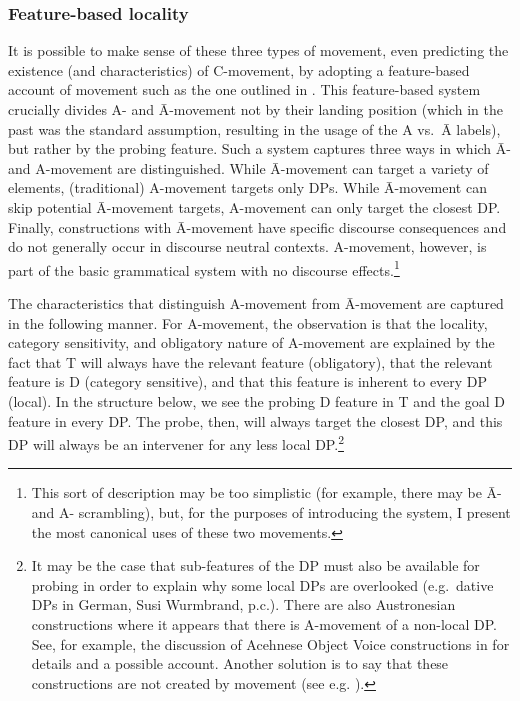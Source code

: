 \documentclass[output=paper,colorlinks,citecolor=brown,
]{langscibook}
\begin{document}
\subsubsection{Feature-based locality\label{sec:feature}}

It is possible to make sense of these three types of movement, even predicting the existence (and characteristics) of C-movement, by adopting a feature-based account of movement such as the one outlined in \citet{vanUrk:2015a}. This feature-based system crucially divides A- and \=A-movement not by their landing position (which in the past was the standard assumption, resulting in the usage of the A vs.\ \=A labels), but rather by the probing feature. Such a  system  captures three ways in which \=A- and A-movement are distinguished.  While \=A-movement can target a variety of elements, (traditional) A-movement targets only DPs.  While \=A-movement can skip potential \=A-movement targets, A-movement can only target the closest DP.  Finally, constructions with \=A-movement have specific discourse consequences and do not generally occur in discourse neutral contexts.  A-movement, however, is part of the basic grammatical system with no discourse effects.\footnote{This sort of description may be too simplistic (for example, there may be \=A- and A- scrambling), but, for the purposes of introducing the system, I present the most canonical uses of these two movements.}  

The characteristics that distinguish  A-movement from \=A-movement are captured in the following manner.  For A-movement, the observation is that the locality, category sensitivity, and obligatory nature of A-movement are explained by the fact that T will always have the relevant feature (obligatory), that the relevant feature is D (category sensitive), and that this feature is inherent to every DP (local).  In the structure below, we see the probing D feature in T and the goal D feature in every DP.  The probe, then, will always target the closest DP, and this DP will always be an intervener for any less local DP.\footnote{It may be the case that sub-features of the DP must also be available for probing in order to explain why some local DPs are overlooked (e.g.\ dative DPs in German, Susi Wurmbrand, p.c.).  There are also  Austronesian constructions where it appears that there is A-movement of a non-local DP.  See, for example, the discussion of Acehnese Object Voice constructions in \citet[Chapter 3]{Legate:2014} for details and a possible account.  Another solution is to say that these constructions are not created by movement (see e.g. \citealt{Travis:2006a}).}
\end{document}
